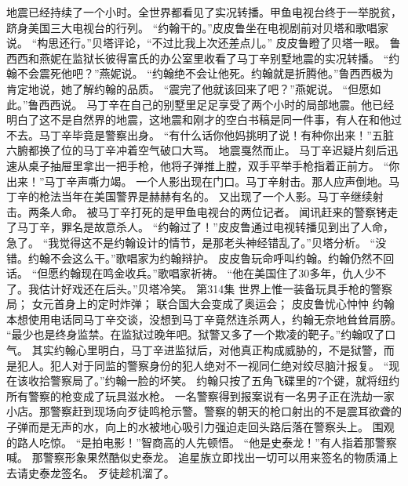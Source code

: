 \documentclass[a4paper,12pt,UTF8,twoside]{ctexbook}
\begin{document}
        地震已经持续了一个小时。全世界都看见了实况转播。甲鱼电视台终于一举脱贫，跻身美国三大电视台的行列。  
        “约翰干的。”皮皮鲁坐在电视剧前对贝塔和歌唱家说。  
        “构思还行。”贝塔评论，“不过比我上次还差点儿。”  
        皮皮鲁瞪了贝塔一眼。  
        鲁西西和燕妮在监狱长彼得富氏的办公室里收看了马丁辛别墅地震的实况转播。  
        “约翰不会震死他吧？”燕妮说。  
        “约翰绝不会让他死。约翰就是折腾他。”鲁西西极为肯定地说，她了解约翰的品质。  
        “震完了他就该回来了吧？”燕妮说。  
        “但愿如此。”鲁西西说。  
        马丁辛在自己的别墅里足足享受了两个小时的局部地震。他已经明白了这不是自然界的地震，这地震和刚才的空白书稿是同一件事，有人在和他过不去。马丁辛毕竟是警察出身。  
        “有什么话你他妈挑明了说！有种你出来！”五脏六腑都换了位的马丁辛冲着空气破口大骂。  
        地震戛然而止。  
        马丁辛迟疑片刻后迅速从桌子抽屉里拿出一把手枪，他将子弹推上膛，双手平举手枪指着正前方。  
        “你出来！”马丁辛声嘶力竭。  
        一个人影出现在门口。马丁辛射击。那人应声倒地。马丁辛的枪法当年在美国警界是赫赫有名的。  
        又出现了一个人影。马丁辛继续射击。两条人命。  
        被马丁辛打死的是甲鱼电视台的两位记者。  
        闻讯赶来的警察铐走了马丁辛，罪名是故意杀人。  
        “约翰过了！”皮皮鲁通过电视转播见到出了人命，急了。  
        “我觉得这不是约翰设计的情节，是那老头神经错乱了。”贝塔分析。  
        “没错。约翰不会这么干。”歌唱家为约翰辩护。  
        皮皮鲁玩命呼叫约翰。约翰仍然不回话。  
        “但愿约翰现在鸣金收兵。”歌唱家祈祷。  
        “他在美国住了30多年，仇人少不了。我估计好戏还在后头。”贝塔冷笑。          第314集  
        世界上惟一装备玩具手枪的警察局；  
        女元首身上的定时炸弹；  
        联合国大会变成了奥运会；  
        皮皮鲁忧心忡忡    
        约翰本想使用电话同马丁辛交谈，没想到马丁辛竟然连杀两人，约翰无奈地耸耸肩膀。  
        “最少也是终身监禁。在监狱过晚年吧。狱警又多了一个欺凌的靶子。”约翰叹了口气。  
        其实约翰心里明白，马丁辛进监狱后，对他真正构成威胁的，不是狱警，而是犯人。犯人对于同监的警察身份的犯人绝对不一视同仁绝对绞尽脑汁报复。  
        “现在该收拾警察局了。”约翰一脸的坏笑。  
        约翰只按了五角飞碟里的7个键，就将纽约所有警察的枪变成了玩具滋水枪。        
        一名警察得到报案说有一名男子正在洗劫一家小店。那警察赶到现场向歹徒鸣枪示警。警察的朝天的枪口射出的不是震耳欲聋的子弹而是无声的水，向上的水被地心吸引力强迫走回头路后落在警察头上。  
        围观的路人吃惊。  
        “是拍电影！”智商高的人先顿悟。  
        “他是史泰龙！”有人指着那警察喊。  
        那警察形象果然酷似史泰龙。  
        追星族立即找出一切可以用来签名的物质涌上去请史泰龙签名。  
        歹徒趁机溜了。  
\end{document}
